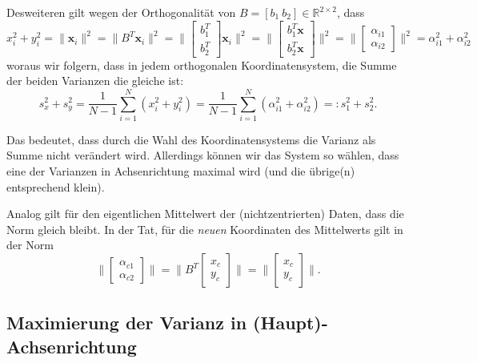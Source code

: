 \documentclass[
]{book}
\theoremstyle{definition}
\theoremstyle{definition}
\theoremstyle{definition}
\theoremstyle{definition}
\theoremstyle{remark}
\begin{document}
Desweiteren gilt wegen der Orthogonalität von \(B=[b_1~b_2]\in \mathbb R^{2\times 2}\), dass
\begin{equation*}
x_{i}^2 + y_{i}^2 = \|\mathbf x_i\|^2 = \|B^T\mathbf x_i\|^2 
= \|\begin{bmatrix} b_1^T \\ b_2^T \end{bmatrix} \mathbf x_i\|^2
= \|\begin{bmatrix} b_1^T\mathbf x \\ b_2^T\mathbf x \end{bmatrix}\|^2
= \|\begin{bmatrix} \alpha_{i1} \\ \alpha_{i2} \end{bmatrix}\|^2
= \alpha_{i1}^2 + \alpha_{i2}^2
\end{equation*}
woraus wir folgern, dass in jedem orthogonalen Koordinatensystem, die Summe der beiden Varianzen die gleiche ist:
\begin{equation*}
s_x^2 + s_y^2 = \frac{1}{N-1}\sum_{i=1}^N(x_i^2 + y_i^2) = \frac{1}{N-1}\sum_{i=1}^N(\alpha_{i1}^2 + \alpha_{i2}^2) =: s_1^2 + s_2^2.
\end{equation*}

Das bedeutet, dass durch die Wahl des Koordinatensystems die Varianz als Summe nicht verändert wird. Allerdings können wir das System so wählen, dass eine der Varianzen in Achsenrichtung maximal wird (und die übrige(n) entsprechend klein).

Analog gilt für den eigentlichen Mittelwert der (nichtzentrierten) Daten, dass die Norm gleich bleibt. In der Tat, für die \emph{neuen} Koordinaten des Mittelwerts gilt in der Norm
\begin{equation*}
\|
\begin{bmatrix}
\alpha_{c1} \\ \alpha_{c2}
\end{bmatrix}
\|
=
\|
B^T
\begin{bmatrix}
x_c \\ y_c
\end{bmatrix}
\|
=
\|
\begin{bmatrix}
x_c \\ y_c
\end{bmatrix}
\|.
\end{equation*}

\hypertarget{sec-pca-maximierung}{%
\subsection{Maximierung der Varianz in (Haupt)-Achsenrichtung}\label{sec-pca-maximierung}}
\end{document}
